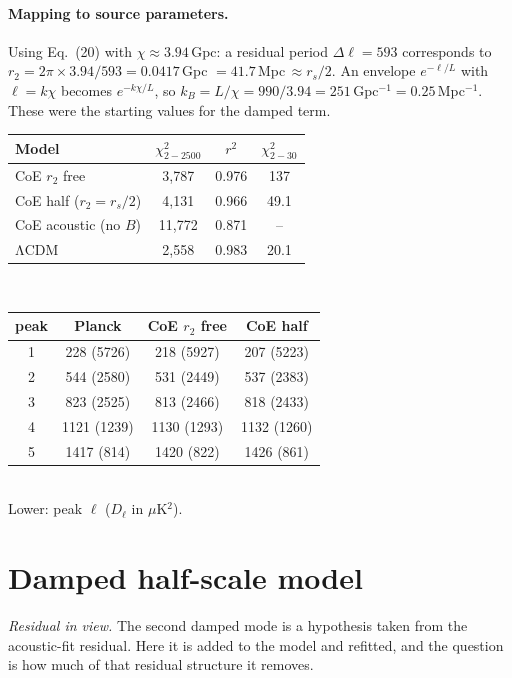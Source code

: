 \documentclass[10pt,twocolumn]{article}
\begin{document}
\paragraph{Mapping to source parameters.} Using Eq.~(20) with $\chi\approx3.94$\,Gpc: a residual period $\Delta\ell=593$ corresponds to $r_2=2\pi\times3.94/593=0.0417$\,Gpc $=41.7$\,Mpc$\,\approx r_s/2$. An envelope $e^{-\ell/L}$ with $\ell=k\chi$ becomes $e^{-k\chi/L}$, so $k_B=L/\chi=990/3.94=251$\,Gpc$^{-1}=0.25$\,Mpc$^{-1}$. These were the starting values for the damped term.

\par\medskip\noindent\begin{minipage}{\columnwidth}\centering\footnotesize\setlength{\tabcolsep}{4pt}
\begin{tabular}{lccc}\toprule
Model & $\chi^2_{2-2500}$ & $r^2$ & $\chi^2_{2-30}$\\\midrule
CoE $r_2$ free & 3{,}787 & 0.976 & 137\\
CoE half ($r_2=r_s/2$) & 4{,}131 & 0.966 & 49.1\\
CoE acoustic (no $B$) & 11{,}772 & 0.871 & --\\
ΛCDM & 2{,}558 & 0.983 & 20.1\\\bottomrule
\end{tabular}\\[6pt]
\begin{tabular}{cccc}\toprule
peak & Planck & CoE $r_2$ free & CoE half\\\midrule
1&228 (5726)&218 (5927)&207 (5223)\\
2&544 (2580)&531 (2449)&537 (2383)\\
3&823 (2525)&813 (2466)&818 (2433)\\
4&1121 (1239)&1130 (1293)&1132 (1260)\\
5&1417 (814)&1420 (822)&1426 (861)\\\bottomrule
\end{tabular}\\[2pt]
Lower: peak $\ell$ ($D_\ell$ in $\mu$K$^2$).
\end{minipage}\par\medskip
\section{Damped half-scale model}
\noindent\emph{Residual in view.} The second damped mode is a hypothesis taken from the acoustic-fit residual. Here it is added to the model and refitted, and the question is how much of that residual structure it removes.
\end{document}
